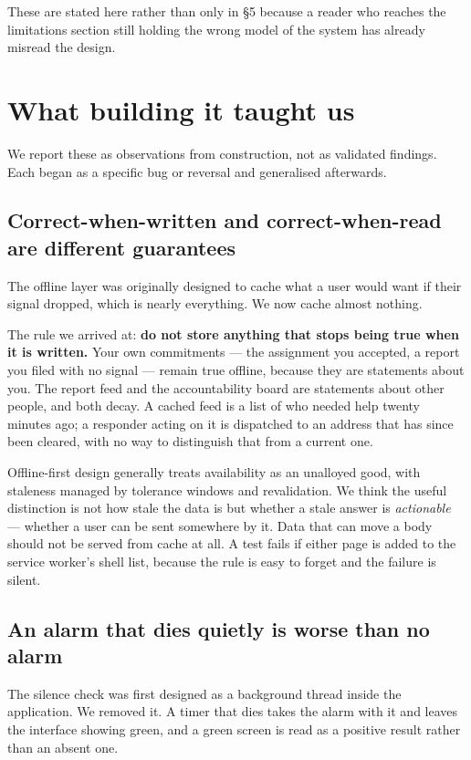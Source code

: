 These are stated here rather than only in §5 because a reader who
reaches the limitations section still holding the wrong model of the
system has already misread the design.

\section{What building it taught us}

We report these as observations from construction, not as validated
findings. Each began as a specific bug or reversal and generalised
afterwards.

\subsection{Correct-when-written and correct-when-read are different guarantees}

The offline layer was originally designed to cache what a user would
want if their signal dropped, which is nearly everything. We now cache
almost nothing.

The rule we arrived at: \textbf{do not store anything that stops being
true when it is written.} Your own commitments --- the assignment you
accepted, a report you filed with no signal --- remain true offline,
because they are statements about you. The report feed and the
accountability board are statements about other people, and both decay.
A cached feed is a list of who needed help twenty minutes ago; a
responder acting on it is dispatched to an address that has since been
cleared, with no way to distinguish that from a current one.

Offline-first design generally treats availability as an unalloyed good,
with staleness managed by tolerance windows and revalidation. We think
the useful distinction is not how stale the data is but whether a stale
answer is \emph{actionable} --- whether a user can be sent somewhere by
it. Data that can move a body should not be served from cache at all. A
test fails if either page is added to the service worker's shell list,
because the rule is easy to forget and the failure is silent.

\subsection{An alarm that dies quietly is worse than no alarm}

The silence check was first designed as a background thread inside the
application. We removed it. A timer that dies takes the alarm with it
and leaves the interface showing green, and a green screen is read as a
positive result rather than an absent one.

